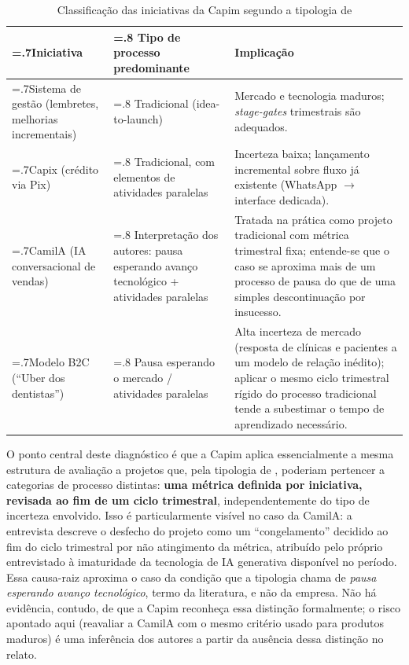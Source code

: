 \begin{table}[h]
  \centering
  \caption{Classificação das iniciativas da Capim segundo a tipologia de \textcite{salerno2015}}
  \label{tab:tipologia}
  \begin{tabularx}{\textwidth}{>{\hsize=.7\hsize}X>{\hsize=.8\hsize}X>{\hsize=1.5\hsize}X}
    \toprule
    \textbf{Iniciativa} & \textbf{Tipo de processo predominante} & \textbf{Implicação} \\
    \midrule
    Sistema de gestão (lembretes, melhorias incrementais) & Tradicional (idea-to-launch) & Mercado e tecnologia maduros; \textit{stage-gates} trimestrais são adequados. \\
    Capix (crédito via Pix) & Tradicional, com elementos de atividades paralelas & Incerteza baixa; lançamento incremental sobre fluxo já existente (WhatsApp $\rightarrow$ interface dedicada). \\
    CamilA (IA conversacional de vendas) & Interpretação dos autores: pausa esperando avanço tecnológico + atividades paralelas & Tratada na prática como projeto tradicional com métrica trimestral fixa; entende-se que o caso se aproxima mais de um processo de pausa do que de uma simples descontinuação por insucesso. \\
    Modelo B2C (``Uber dos dentistas'') & Pausa esperando o mercado / atividades paralelas & Alta incerteza de mercado (resposta de clínicas e pacientes a um modelo de relação inédito); aplicar o mesmo ciclo trimestral rígido do processo tradicional tende a subestimar o tempo de aprendizado necessário. \\
    \bottomrule
  \end{tabularx}
\end{table}

O ponto central deste diagnóstico é que a Capim aplica essencialmente a mesma estrutura de avaliação a projetos que, pela tipologia de \textcite{salerno2015}, poderiam pertencer a categorias de processo distintas: \textbf{uma métrica definida por iniciativa, revisada ao fim de um ciclo trimestral}, independentemente do tipo de incerteza envolvido. Isso é particularmente visível no caso da CamilA: a entrevista descreve o desfecho do projeto como um ``congelamento'' decidido ao fim do ciclo trimestral por não atingimento da métrica, atribuído pelo próprio entrevistado à imaturidade da tecnologia de IA generativa disponível no período. Essa causa-raiz aproxima o caso da condição que a tipologia chama de \textit{pausa esperando avanço tecnológico}, termo da literatura, e não da empresa. Não há evidência, contudo, de que a Capim reconheça essa distinção formalmente; o risco apontado aqui (reavaliar a CamilA com o mesmo critério usado para produtos maduros) é uma inferência dos autores a partir da ausência dessa distinção no relato.

